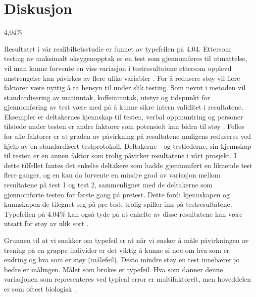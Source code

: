 \documentclass[
]{book}
\begin{document}
\hypertarget{diskusjon}{%
\section{Diskusjon}\label{diskusjon}}

4,04\%

Resultatet i vår realibiltetsstudie er funnet av typefeilen på 4,04. Ettersom testing av maksimalt oksygenopptak er en test som gjennomføres til utmattelse, vil man kunne forvente en viss variasjon i testresultatene ettersom opplevd anstrengelse kan påvirkes av flere ulike variabler \citep{halperin2015}. For å redusere støy vil flere faktorer være nyttig å ta hensyn til under slik testing. Som nevnt i metoden vil standardisering av matinntak, koffeininntak, utstyr og tidspunkt for gjennomføring av test være med på å kunne sikre intern validitet i resultatene. Eksempler er deltakernes kjennskap til testen, verbal oppmuntring og personer tilstede under testen er andre faktorer som potensielt kan bidra til støy \citep{halperin2015}. Felles for alle faktorer er at graden av påvirkning på resultatene muligens reduseres ved hjelp av en standardisert testprotokoll. Deltakerne - og testlederne, sin kjennskap til testen er en annen faktor som trolig påvirker resultatene i vårt prosjekt. I dette tilfellet fantes det enkelte deltakere som hadde gjennomført en liknende test flere ganger, og en kan da forvente en mindre grad av variasjon mellom resultatene på test 1 og test 2, sammenlignet med de deltakerne som gjennomførte testen for første gang på pretest. Dette fordi kjennskapen og kunnskapen de tilegnet seg på pre-test, trolig spiller inn på testresultatene. Typefeilen på 4.04\% kan også tyde på at enkelte av disse resultatene kan være utsatt for støy av ulik sort \citep{hopkins2000}.

Grunnen til at vi snakker om typefeil er at når vi ønsker å måle påvirkningen av trening på en gruppe individer er det viktig å kunne si noe om hva som er endring og hva som er støy (målefeil). Desto mindre støy en test innebærer jo bedre er målingen. Målet som brukes er typefeil. Hva som danner denne variasjonen som representeres ved typical error er multifaktorelt, men hoveddelen er som oftest biologisk \citep{hopkins2000}.
\end{document}
